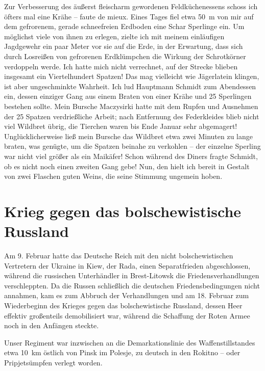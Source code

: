 \documentclass[a5paper,pagesize,10pt,twoside=true]{scrbook}
\renewcommand{\marginpar}[2][]{}
\begin{document}
Zur Verbesserung des äußerst fleischarm gewordenen Feldküchenessens schoss ich öfters mal eine Krähe -- faute de mieux. Eines Tages fiel etwa 50~m von mir auf dem gefrorenem, gerade schneefreien Erdboden eine Schar Sperlinge ein. Um möglichst viele von ihnen zu erlegen, zielte ich mit meinem einläufigen Jagdgewehr ein paar Meter vor sie auf die Erde, in der Erwartung, dass sich durch Losreißen von gefrorenen Erdklümpchen die Wirkung der Schrotkörner verdoppeln werde. Ich hatte mich nicht verrechnet, auf der Strecke blieben insgesamt ein Viertelhundert Spatzen! Das mag vielleicht wie Jägerlatein klingen, ist aber \marginpar{322} ungeschminkte Wahrheit. Ich lud Hauptmann Schmidt zum Abendessen ein, dessen einziger Gang aus einem Braten von einer Krähe und 25 Sperlingen bestehen sollte. Mein Bursche Maczysirki hatte mit dem Rupfen und Ausnehmen der 25 Spatzen verdrießliche Arbeit; nach Entfernung des Federkleides blieb nicht viel Wildbret übrig, die Tierchen waren bis Ende Januar sehr abgemagert! Unglücklicherweise ließ mein Bursche das Wildbret etwa zwei Minuten zu lange braten, was genügte, um die Spatzen beinahe zu verkohlen -- der einzelne Sperling war nicht viel größer als ein Maikäfer! Schon während des Diners fragte Schmidt, ob es nicht noch einen zweiten Gang gebe! Nun, den hielt ich bereit in Gestalt von zwei Flaschen guten Weins, die seine Stimmung ungemein hoben.

\section{Krieg gegen das bolschewistische Russland}
Am 9. Februar hatte das Deutsche Reich mit den nicht bolschewistischen Vertretern der Ukraine in Kiew, der Rada, einen Separatfrieden abgeschlossen, während die russischen Unterhändler in Brest-Litowsk die Friedensverhandlungen verschleppten. Da die Russen schließlich die deutschen Friedensbedingungen nicht annahmen, kam es zum Abbruch der Verhandlungen und am 18. Februar zum Wiederbeginn des Krieges gegen das bolschewistische Russland, dessen Heer effektiv großenteils demobilisiert war, während die Schaffung der Roten Armee noch in den Anfängen steckte.

Unser Regiment war inzwischen an die Demarkationslinie des Waffenstillstandes etwa 10~km östlich von Pinsk im Polesje, zu deutsch in den Rokitno -- oder Pripjetsümpfen verlegt worden.
\end{document}
